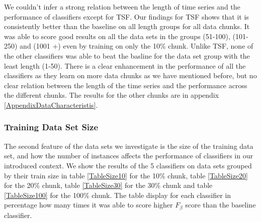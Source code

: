 We couldn't infer a strong relation between the length of time series and the performance of classifiers except for TSF. 
Our findings for TSF shows that it is consistently better than the baseline on all length groups for all data chunks.
It was able to score good results on all the data sets in the groups (51-100), (101-250) and (1001 +) even by training on only the 10\% chunk.
Unlike TSF, none of the other classifiers was able to beat the basline for the data set group with the least length (1-50).
There is a clear enhancement in the performance of all the classifiers as they learn on more data chunks as we have mentioned before,
but no clear relation between the length of the time series and the performance across the different chunks.
The results for the other chunks are in appendix \ref{AppendixDataCharacteristis}.



\subsubsection{Training Data Set Size}
The second feature of the data sets we investigate is the size of the training data set, and how the number of instances affects the performance of classifiers in our introduced context.
We show the results of the 5 classifiers on data sets grouped by their train size in table \ref{TableSize10} for the 10\% chunk, table \ref{TableSize20} for the 20\% chunk, table \ref{TableSize30} for the 30\% chunk and table \ref{TableSize100} for the 100\% chunk.
The table display for each classifier in percentage how many times it was able to score higher $F_{\beta}$ score than the baseline classifier.

